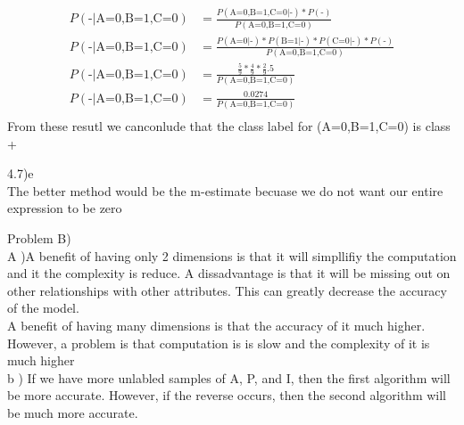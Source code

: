 \documentclass[12pt,english]{article}
\begin{document}
\begin{equation}
\begin{split}
P(\mbox{-} \vert \mbox{A=0,B=1,C=0}) &= \frac{P(\mbox{A=0,B=1,C=0} \vert \mbox{-}) * P(\mbox{-})}{P(\mbox{A=0,B=1,C=0})}\\
P(\mbox{-} \vert \mbox{A=0,B=1,C=0}) &= \frac{P(\mbox{A=0} \vert \mbox{-}) * P(\mbox{B=1} \vert \mbox{-}) *P(\mbox{C=0} \vert \mbox{-}) * P(\mbox{-})}{P(\mbox{A=0,B=1,C=0})}\\
P(\mbox{-} \vert \mbox{A=0,B=1,C=0}) &= \frac{\frac{5}{9} * \frac{4}{9} *\frac{2}{9} .5}{P(\mbox{A=0,B=1,C=0})}\\
P(\mbox{-} \vert \mbox{A=0,B=1,C=0}) &= \frac{0.0274}{P(\mbox{A=0,B=1,C=0})}\\
\end{split}
\end{equation}
From these resutl we canconlude that the class label for (A=0,B=1,C=0) is class +\\
\par
4.7)e\\
The better method would be the m-estimate becuase we do not want our entire expression to be zero\par
Problem B)\\
A )A benefit of having only 2 dimensions is that it will simpllifiy the computation and it the complexity is reduce. A dissadvantage is that it will be missing out on other relationships with other attributes. This can greatly decrease the accuracy of the model.\\
A benefit of having many dimensions is that the accuracy of it much higher. However,  a problem is that computation is is slow and the complexity of it is much higher\\
b ) If we have more unlabled samples of A, P, and I, then the first algorithm will be more accurate. However, if the reverse occurs, then the second algorithm will be much more accurate.
\end{document}
